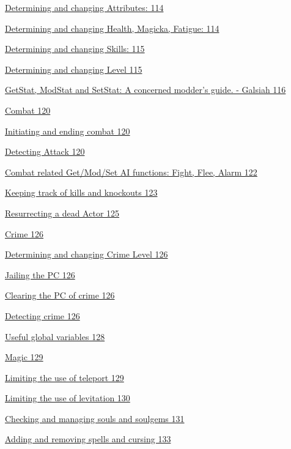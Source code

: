 \documentclass[
]{article}
\begin{document}
\protect\hyperlink{determining-and-changing-attributes}{Determining and
changing Attributes: 114}

\protect\hyperlink{determining-and-changing-health-magicka-fatigue}{Determining
and changing Health, Magicka, Fatigue: 114}

\protect\hyperlink{determining-and-changing-skills}{Determining and
changing Skills: 115}

\protect\hyperlink{determining-and-changing-level}{Determining and
changing Level 115}

\protect\hyperlink{_Toc182634604}{GetStat, ModStat and SetStat: A
concerned modder's guide. - Galsiah 116}

\protect\hyperlink{combat}{Combat 120}

\protect\hyperlink{initiating-and-ending-combat}{Initiating and ending
combat 120}

\protect\hyperlink{detecting-attack}{Detecting Attack 120}

\protect\hyperlink{combat-related-getmodset-ai-functions-fight-flee-alarm}{Combat
related Get/Mod/Set AI functions: Fight, Flee, Alarm 122}

\protect\hyperlink{keeping-track-of-kills-and-knockouts}{Keeping track
of kills and knockouts 123}

\protect\hyperlink{resurrecting-a-dead-actor}{Resurrecting a dead Actor
125}

\protect\hyperlink{crime}{Crime 126}

\protect\hyperlink{determining-and-changing-crime-level}{Determining and
changing Crime Level 126}

\protect\hyperlink{jailing-the-pc}{Jailing the PC 126}

\protect\hyperlink{clearing-the-pc-of-crime}{Clearing the PC of crime
126}

\protect\hyperlink{detecting-crime}{Detecting crime 126}

\protect\hyperlink{useful-global-variables}{Useful global variables 128}

\protect\hyperlink{magic}{Magic 129}

\protect\hyperlink{limiting-the-use-of-teleport}{Limiting the use of
teleport 129}

\protect\hyperlink{limiting-the-use-of-levitation}{Limiting the use of
levitation 130}

\protect\hyperlink{checking-and-managing-souls-and-soulgems}{Checking
and managing souls and soulgems 131}

\protect\hyperlink{adding-and-removing-spells-and-cursing}{Adding and
removing spells and cursing 133}
\end{document}
